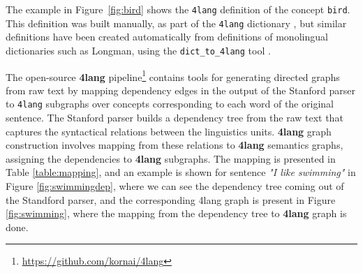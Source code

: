 The example in
Figure~\ref{fig:bird} shows the \texttt{4lang} definition of the
concept \texttt{bird}. This definition was built manually, as part of
the \texttt{4lang} dictionary \cite{Kornai:2013}, but similar
definitions have been created automatically from definitions of
monolingual dictionaries such as Longman, using the
\texttt{dict\_to\_4lang} tool \cite{Recski:2016d}.

The open-source \textbf{4lang} pipeline\footnote{\url{https://github.com/kornai/4lang}}
contains tools for generating
directed graphs from raw text by mapping dependency edges in the output of the
Stanford parser \cite{deMarneffe:2006} to \texttt{4lang} subgraphs over
concepts corresponding to each word of the original sentence. The Stanford parser builds a dependency tree from the raw text that captures the syntactical relations between the linguistics units. \textbf{4lang} graph construction involves mapping from these relations to \textbf{4lang} semantics graphs, assigning the dependencies to \textbf{4lang} subgraphs. The mapping is presented in Table \ref{table:mapping}, and an example is shown for sentence \textit{"I like swimming"} in Figure \ref{fig:swimmingdep}, where we can see the dependency tree coming out of the Standford parser, and the corresponding 4lang graph is present in Figure \ref{fig:swimming}, where the mapping from the dependency tree to \textbf{4lang} graph is done. 


